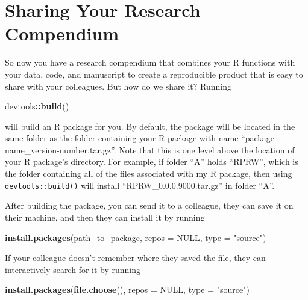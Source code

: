 \documentclass[
]{book}
\newenvironment{Shaded}{\begin{snugshade}}{\end{snugshade}}
\newcommand{\DataTypeTok}[1]{\textcolor[rgb]{0.13,0.29,0.53}{#1}}
\newcommand{\KeywordTok}[1]{\textcolor[rgb]{0.13,0.29,0.53}{\textbf{#1}}}
\newcommand{\NormalTok}[1]{#1}
\newcommand{\OperatorTok}[1]{\textcolor[rgb]{0.81,0.36,0.00}{\textbf{#1}}}
\newcommand{\OtherTok}[1]{\textcolor[rgb]{0.56,0.35,0.01}{#1}}
\newcommand{\StringTok}[1]{\textcolor[rgb]{0.31,0.60,0.02}{#1}}
\begin{document}
\hypertarget{sharing-your-research-compendium}{%
\section{Sharing Your Research Compendium}\label{sharing-your-research-compendium}}

So now you have a research compendium that combines your R functions with your data, code, and manuscript to create a reproducible product that is easy to share with your colleagues. But how do we share it? Running

\begin{Shaded}
\begin{Highlighting}[]
\NormalTok{devtools}\OperatorTok{::}\KeywordTok{build}\NormalTok{()}
\end{Highlighting}
\end{Shaded}

will build an R package for you. By default, the package will be located in the same folder as the folder containing your R package with name ``package-name\_version-number.tar.gz''. Note that this is one level above the location of your R package's directory. For example, if folder ``A'' holds ``RPRW'', which is the folder containing all of the files associated with my R package, then using \texttt{devtools::build()} will install ``RPRW\_0.0.0.9000.tar.gz'' in folder ``A''.

After building the package, you can send it to a colleague, they can save it on their machine, and then they can install it by running

\begin{Shaded}
\begin{Highlighting}[]
\KeywordTok{install.packages}\NormalTok{(path_to_package, }\DataTypeTok{repos =} \OtherTok{NULL}\NormalTok{, }\DataTypeTok{type =} \StringTok{"source"}\NormalTok{)}
\end{Highlighting}
\end{Shaded}

If your colleague doesn't remember where they saved the file, they can interactively search for it by running

\begin{Shaded}
\begin{Highlighting}[]
\KeywordTok{install.packages}\NormalTok{(}\KeywordTok{file.choose}\NormalTok{(), }\DataTypeTok{repos =} \OtherTok{NULL}\NormalTok{, }\DataTypeTok{type =} \StringTok{"source"}\NormalTok{)}
\end{Highlighting}
\end{Shaded}
\end{document}
